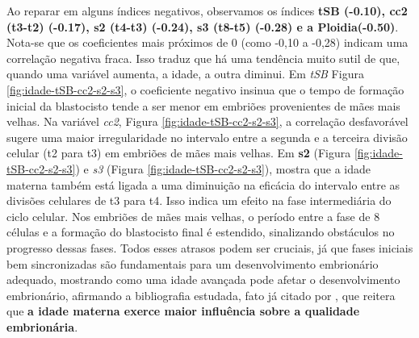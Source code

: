 Ao reparar em alguns índices negativos, observamos os índices \textbf{tSB (-0.10), cc2 (t3-t2) (-0.17), s2 (t4-t3) (-0.24),  s3 (t8-t5) (-0.28) e a Ploidia(-0.50)}. Nota-se que os coeficientes mais próximos de 0 (como -0,10 a -0,28) indicam uma correlação negativa fraca. Isso traduz que há uma tendência muito sutil de que, quando uma variável aumenta, a idade, a outra diminui. Em \textit{tSB} Figura \ref{fig:idade-tSB-cc2-s2-s3}, o coeficiente negativo insinua que o tempo de formação inicial da blastocisto tende a ser menor em embriões provenientes de mães mais velhas. Na variável \textit{cc2}, Figura \ref{fig:idade-tSB-cc2-s2-s3}, a correlação desfavorável sugere uma maior irregularidade no intervalo entre a segunda e a terceira divisão celular (t2 para t3) em embriões de mães mais velhas. Em \textbf{s2} (Figura \ref{fig:idade-tSB-cc2-s2-s3}) e \textit{s3} (Figura \ref{fig:idade-tSB-cc2-s2-s3}), mostra que a idade materna também está ligada a uma diminuição na eficácia do intervalo entre as divisões celulares de t3 para t4. Isso indica um efeito na fase intermediária do ciclo celular. Nos embriões de mães mais velhas, o período entre a fase de 8 células e a formação do blastocisto final é estendido, sinalizando obstáculos no progresso dessas fases. Todos esses atrasos podem ser cruciais, já que fases iniciais bem sincronizadas são fundamentais para um desenvolvimento embrionário adequado, mostrando como uma idade avançada pode afetar o desenvolvimento embrionário, afirmando a bibliografia estudada, fato já citado por , que reitera que \textbf{a idade materna exerce maior influência sobre a qualidade embrionária}.

